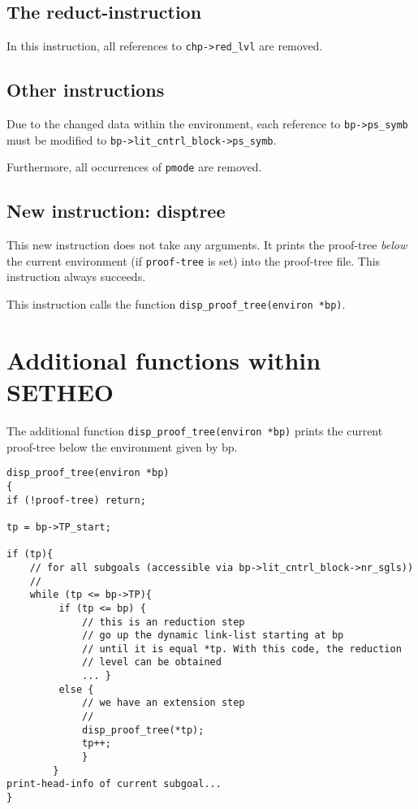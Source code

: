 \subsection{The reduct-instruction}

In this instruction, all references to {\tt chp->red\_lvl} are removed.

\subsection{Other instructions}
Due to the changed data within the environment, each reference to
{\tt bp->ps\_symb} must be modified to {\tt bp->lit\_cntrl\_block->ps\_symb}.

Furthermore, all occurrences of {\tt pmode} are removed.


\subsection{New instruction: disptree}

This new instruction does not take any arguments. It prints the 
proof-tree {\em below\/} the current environment (if {\tt proof-tree} is set)
into the proof-tree file.
This instruction always succeeds.

This instruction calls the function {\tt disp\_proof\_tree(environ *bp)}.

\section{Additional functions within SETHEO}

The additional function {\tt disp\_proof\_tree(environ *bp)} prints
the current proof-tree below the environment given by bp.

\begin{verbatim}
disp_proof_tree(environ *bp)
{
if (!proof-tree) return;

tp = bp->TP_start;

if (tp){
    // for all subgoals (accessible via bp->lit_cntrl_block->nr_sgls))
    //
    while (tp <= bp->TP){
         if (tp <= bp) {
             // this is an reduction step
             // go up the dynamic link-list starting at bp
             // until it is equal *tp. With this code, the reduction
             // level can be obtained
             ... }
         else {		
             // we have an extension step
             //
             disp_proof_tree(*tp);
             tp++;
             }
        }
print-head-info of current subgoal...
}
\end{verbatim}
        



